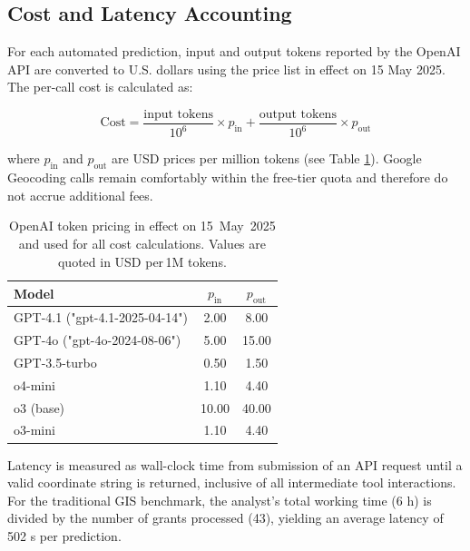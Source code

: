 \subsection{Cost and Latency
Accounting}\label{cost-and-latency-accounting}

For each automated prediction, input and output tokens reported by the
OpenAI API are converted to U.S. dollars using the price list in effect
on 15 May 2025. The per-call cost is calculated as:

\[
\text{Cost} = \frac{\text{input tokens}}{10^{6}} \times p_{\text{in}} + \frac{\text{output tokens}}{10^{6}} \times p_{\text{out}}
\]

where \(p_{\text{in}}\) and \(p_{\text{out}}\) are USD prices per
million tokens (see Table \DIFdelbegin \DIFdel{\textasciitilde{}}\DIFdelend \ref{tbl:prices}). Google Geocoding calls
remain comfortably within the free-tier quota and therefore do not
accrue additional fees.

\DIFdelbegin %
\DIFdelendFL \DIFaddbeginFL \begin{table}
\DIFaddendFL \centering
\caption{OpenAI token pricing in effect on 15~May~2025 and used for all cost calculations.  Values are quoted in USD per\,1M tokens.}
\label{tbl:prices}
\begin{tabular}{lcc}
\toprule
Model & $p_{\text{in}}$ & $p_{\text{out}}$ \\
\midrule
GPT-4.1 ("gpt-4.1-2025-04-14") & 2.00 & 8.00 \\
GPT-4o ("gpt-4o-2024-08-06") & 5.00 & 15.00 \\
GPT-3.5-turbo & 0.50 & 1.50 \\
o4-mini & 1.10 & 4.40 \\
o3 (base) & 10.00 & 40.00 \\
o3-mini & 1.10 & 4.40 \\
\bottomrule
\end{tabular}
\end{table}

Latency is measured as wall-clock time from submission of an API request
until a valid coordinate string is returned, inclusive of all
intermediate tool interactions. For the traditional GIS benchmark, the
analyst's total working time (6 h) is divided by the number of grants
processed (43), yielding an average latency of 502 s per prediction. \DIFaddbegin {}\DIFaddend 

